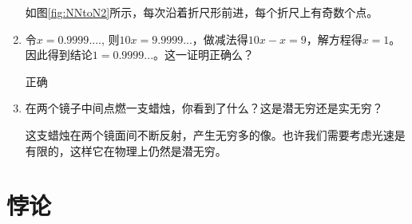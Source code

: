 \documentclass[UTF8]{article}
\begin{document}
\begin{enumerate}
如图\ref{fig:NNtoN2}所示，每次沿着折尺形前进，每个折尺上有奇数个点。

\item 令$x = 0.9999....$, 则$10x = 9.9999...$，做减法得$10x - x = 9$，解方程得$x = 1$。因此得到结论$1 = 0.9999...$。这一证明正确么？

正确

\item 在两个镜子中间点燃一支蜡烛，你看到了什么？这是潜无穷还是实无穷？

这支蜡烛在两个镜面间不断反射，产生无穷多的像。也许我们需要考虑光速是有限的，这样它在物理上仍然是潜无穷。

\end{enumerate}

\section{悖论}
\end{document}

